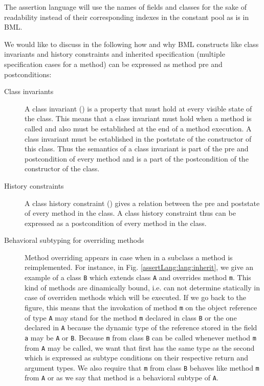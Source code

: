 The assertion language will use the names of fields and classes for the sake of readability instead of their corresponding indexes
in the constant pool as is in BML.

We would like to discuss in the following how and why BML constructs like class invariants and history constraints and inherited specification
(multiple specification cases for a method) can be expressed as 
method pre and postconditions:

\begin{description} 
  \item [Class invariants] A class invariant (\ClassInv)  is a property that must hold at every visible state of the class. This means that a
        class invariant must hold when a method is called and also must be established at the end of a method execution. 
	A class invariant must be established in the poststate 
	of the constructor of this class.
	Thus the semantics of
	a class invariant is part of the pre and  postcondition of every method and is a part of the postcondition of the constructor of the class.
        
  \item [History constraints] A class history constraint (\ClassHistoryConstr) gives a relation between the pre and poststate of every method in the class. 
        A class history constraint thus can be expressed as a postcondition of every method in the class.
        
  \item [Behavioral subtyping for overriding methods]
        Method overriding appears in case when in a subclass a method is reimplemented.  For instance, in Fig. \ref{assertLang:lang:inherit},
	we give an example of a class \lstinline!B! which extends class   \lstinline!A! and overrides method  \lstinline!m!. 
	This kind of methods are dinamically bound, i.e. can not determine statically in case of overriden methods which will be executed.
	If we go back to the figure, this means that the invokation of method   \lstinline!m! on the object reference of type \lstinline!A!
        may stand for the method  \lstinline!m! declared in class \lstinline!B! or the one declared in \lstinline!A! because the dynamic type of the
	reference stored in the field  \lstinline!a! may be \lstinline!A! or \lstinline!B!. Because  \lstinline!m! from
        class \lstinline!B! can be called whenever method  \lstinline!m! from  \lstinline!A! may be called, we want that first has the same 
	type as the second which is expressed as subtype conditions on their respective return and argument types. We also require that \lstinline!m! from
        class \lstinline!B! behaves like method \lstinline!m! from \lstinline!A! or as we say that method is a behavioral subtype of \lstinline!A!. 
	

\end{description}
